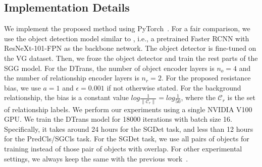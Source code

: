 \subsection{Implementation Details}
We implement the proposed method using PyTorch~\cite{NEURIPS2019_9015}. For a fair comparison, we use the object detection model similar to \cite{Tang2020_unbiased}, i.e., a pretrained Faster RCNN with ResNeXt-101-FPN as the backbone network. The object detector is fine-tuned on the VG dataset. Then, we froze the object detector and train the rest parts of the SGG model.
 For the DTrans, the number of object encoder layers is $n_o = 4$ and the number of relationship encoder layers is $n_r = 2$. For the proposed resistance bias, we use $a = 1$ and $\epsilon =0.001$ if not otherwise stated. For the background relationship, the bias is a constant value $log\frac{1}{\|\mathcal{C}_r\|} = log\frac{1}{50}$, where the $\mathcal{C}_r$ is the set of relationship labels. We perform our experiments using a single NVIDIA V100 GPU. We train the DTrans model for 18000 iterations with batch size 16. Specifically, it takes around 24 hours for the SGDet task, and less than 12 hours for the PredCls/SGCls task. For the SGDet task, we use all pairs of objects for training instead of those pair of objects with overlap. For other experimental settings, we always keep the same with the previous work~\cite{Tang2020_unbiased}.

